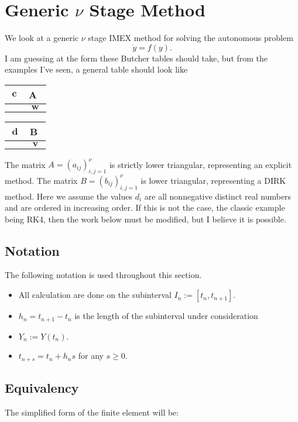 \documentclass{amsart}
\begin{document}
	




\section*{Generic $\nu$ Stage Method}
We look at a generic $\nu$ stage IMEX method for solving the autonomous problem
\[ \dot{y} = f(y).\]
  I am guessing at the form these Butcher tables should take, but from the examples I've seen, a general table should look like

\begin{table}[h]
\begin{tabular}{l|l}
$\mbfc$ & A           \\ \hline
      & $\mbfw$    
\end{tabular}
\hspace{.3in}
\begin{tabular}{l|l}
$\mbfd$ & B          \\ \hline
      & $\mbfv$    
\end{tabular}
\end{table}
The matrix $A = (a_{ij})_{i,j=1}^\nu$ is strictly lower triangular, representing an explicit method.  The matrix $B = (b_{ij})_{i,j=1}^\nu$ is lower triangular, representing a DIRK method.  Here we assume the values $d_i$ are all nonnegative distinct real numbers and are ordered in increasing order.  If this is not the case, the classic example being RK4, then the work below must be modified, but I believe it is possible.
\subsection*{Notation}
	The following notation is used throughout this section.  
	\begin{itemize}
		\item All calculation are done on the subinterval $I_n:= [t_n,t_{n+1}]$.
		\item $h_n = t_{n+1} - t_n$ is the length of the subinterval under consideration
		\item $Y_n:=Y(t_n)$.
		\item $t_{n+s} = t_n + h_ns$ for any $s \geq 0$.
	\end{itemize}

\subsection*{Equivalency}
The simplified form of the finite element will be:
\end{document}
